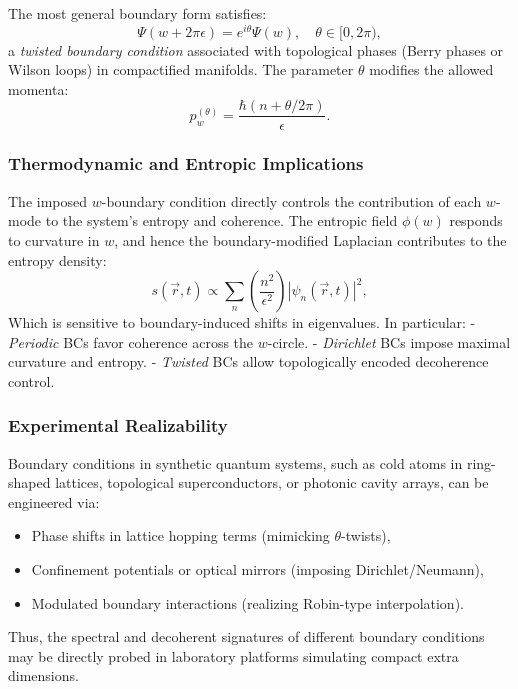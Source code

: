 \documentclass[12pt]{article}
\begin{document}
The most general boundary form satisfies:
\begin{equation}
\Psi(w + 2\pi\epsilon) = e^{i\theta} \Psi(w), \quad \theta \in [0, 2\pi),
\label{eq:theta_twist_bc}
\end{equation}
a \emph{twisted boundary condition} associated with topological phases (Berry phases or Wilson loops) in compactified manifolds. The parameter \(\theta\) modifies the allowed momenta:
\begin{equation}
p_w^{(\theta)} = \frac{\hbar (n + \theta/2\pi)}{\epsilon}.
\end{equation}

\subsubsection*{Thermodynamic and Entropic Implications}

The imposed \(w\)-boundary condition directly controls the contribution of each \(w\)-mode to the system’s entropy and coherence. The entropic field \(\phi(w)\) responds to curvature in \(w\), and hence the boundary-modified Laplacian contributes to the entropy density:
\begin{equation}
s(\vec{r}, t) \propto \sum_n \left( \frac{n^2}{\epsilon^2} \right) |\psi_n(\vec{r}, t)|^2,
\label{eq:entropy_sum}
\end{equation}
Which is sensitive to boundary-induced shifts in eigenvalues. In particular:
- \emph{Periodic} BCs favor coherence across the \(w\)-circle.
- \emph{Dirichlet} BCs impose maximal curvature and entropy.
- \emph{Twisted} BCs allow topologically encoded decoherence control.

\subsubsection*{Experimental Realizability}

Boundary conditions in synthetic quantum systems, such as cold atoms in ring-shaped lattices, topological superconductors, or photonic cavity arrays, can be engineered via:
\begin{itemize}
  \item Phase shifts in lattice hopping terms (mimicking \(\theta\)-twists),
  \item Confinement potentials or optical mirrors (imposing Dirichlet/Neumann),
  \item Modulated boundary interactions (realizing Robin-type interpolation).
\end{itemize}
Thus, the spectral and decoherent signatures of different boundary conditions may be directly probed in laboratory platforms simulating compact extra dimensions.
\end{document}
